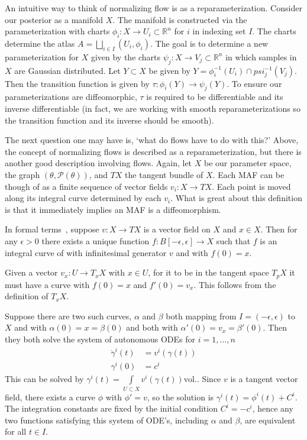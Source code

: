 An intuitive way to think of normalizing flow is as a reparameterization. Consider our posterior as a manifold $X$. The manifold is constructed via the parameterization with charts $\phi_i:X\rightarrow U_i \subset \mathbb{R}^n$ for $i$ in indexing set $I$. 
The charts determine the atlas $A = \bigsqcup\limits_{i\in I} (U_i,\phi_i)$. 
The goal is to determine a new parameterization for $X$ given by the charts $\psi_j:X\rightarrow V_j \subset \mathbb{R}^n$ in which samples in $X$ are Gaussian distributed. 
Let $Y \subset X$ be given by $Y = \phi_i^{-1}(U_i) \cap psi_j^{-1}(V_j)$. 
Then the transition function is given by $\tau:\phi_i(Y)\rightarrow\psi_j(Y)$. 
To ensure our parameterizations are diffeomorphic, $\tau$ is required to be differentiable and its inverse differentiable 
(in fact, we are working with smooth reparameterizations so the transition function and its inverse should be smooth).

The next question one may have is, `what do flows have to do with this?' Above, the concept of normalizing flows is described as a reparameterization, but there is another good description involving flows. Again, let $X$ be our parameter space, the graph $(\theta,\mathcal{P}(\theta))$, and $TX$ the tangent bundle of $X$. Each MAF can be though of as a finite sequence of vector fields $v_i:X \rightarrow TX$. Each point is moved along its integral curve determined by each $v_i$. What is great about this definition is that it immediately implies an MAF is a diffeomorphism. 

In formal terms~\cite{john_lee_smooth_nodate}, suppose $v:X \rightarrow TX$ is a vector field on $X$ and $x \in X$. Then for any $\epsilon>0$ there exists a unique function $f:B[-\epsilon,\epsilon]\rightarrow X$ such that $f$ is an integral curve of with infinitesimal generator $v$ and with $f(0) = x$.  

Given a vector $v_x:U\rightarrow T_x X$ with $x\in U$, for it to be in the tangent space $T_pX$ it must have a curve with $f(0)=x$ and $f'(0)=v_x$. This follows from the definition of $T_xX$.

Suppose there are two such curves, $\alpha$ and $\beta$ both mapping from $I=(-\epsilon,\epsilon)$ to $X$ and with $\alpha(0) = x = \beta(0)$ and both with $\alpha'(0) = v_x = \beta'(0)$. Then they both solve the system of autonomous ODEs for $i=1,\dots,n$
\begin{equation}
\begin{split}
	\dot{\gamma}^i(t) &= v^i(\gamma(t)) \\
	\gamma^i(0) &= c^i
\end{split}
\end{equation}
This can be solved by $\gamma^i(t) = \int\limits_{U\subset X}v^i(\gamma(t))\text{vol.}$. Since $v$ is a tangent vector field, there exists a curve $\phi$ with $\phi' = v$, so the solution is $\gamma^i(t) = \phi^i(t)+C^i$. The integration constants are fixed by the initial condition $C^i=-c^i$, hence any two functions satisfying this system of ODE's, including $\alpha$ and $\beta$, are equivalent for all $t\in I$.

